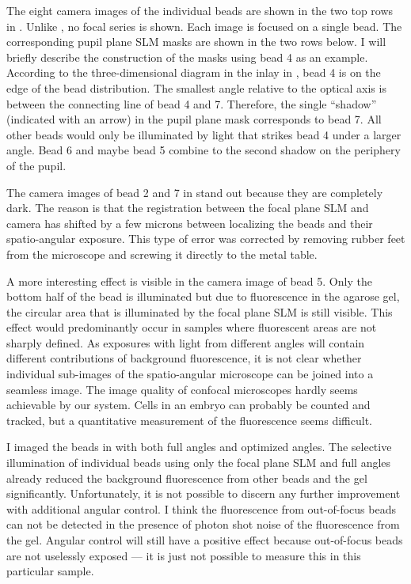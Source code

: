 The eight camera images of the individual beads are shown in the two
top rows in . Unlike , no focal
series is shown. Each image is focused on a single bead. The
corresponding pupil plane SLM masks are shown in the two rows below. I
will briefly describe  the
construction of the masks using bead 4 as an example. According to the
three-dimensional diagram in the inlay in , bead 4 is
on the edge of the bead distribution. The smallest angle relative to
the optical axis is between the connecting line of bead 4 and
7. Therefore, the single ``shadow'' (indicated with an arrow) in the
pupil plane mask corresponds to bead 7. All other beads would only be
illuminated by light that strikes bead 4 under a larger angle. Bead 6
and maybe bead 5 combine to the second shadow on the periphery of the
pupil.

The  camera images of bead 2 and 7 in
 stand out because they are completely dark. The
reason is that the registration between the focal plane SLM and camera
has shifted by a few microns between localizing the beads and their
spatio-angular exposure. This type of error was corrected by removing
rubber feet from the microscope and screwing it directly to the metal
table.

 

A  more interesting effect is visible in the camera
image of bead 5. Only the bottom half of the bead is illuminated but
due to fluorescence in the agarose gel, the circular area that is
illuminated by the focal plane SLM is still visible. This effect would
predominantly occur in samples where fluorescent areas are not sharply
defined. As exposures with light from different angles will contain
different contributions of background fluorescence, it is not clear
whether individual sub-images of the spatio-angular microscope can be
joined into a seamless image. The image quality of confocal
microscopes hardly seems achievable by our system. Cells in an embryo can probably
be counted and tracked, but a quantitative measurement of the
fluorescence seems difficult.

I  imaged the
beads in  with both full angles and optimized
angles. The selective illumination of individual beads using
only the focal plane SLM and full angles already reduced the background
fluorescence from other beads and the gel
significantly. Unfortunately, it is not possible to discern any
further improvement with additional angular control.  I think the
fluorescence from out-of-focus beads can not be detected in the presence of photon
shot noise of the fluorescence from the gel. Angular control will
still have a positive effect because out-of-focus beads are not
uselessly exposed --- it is just not possible to measure this in this
particular sample.

